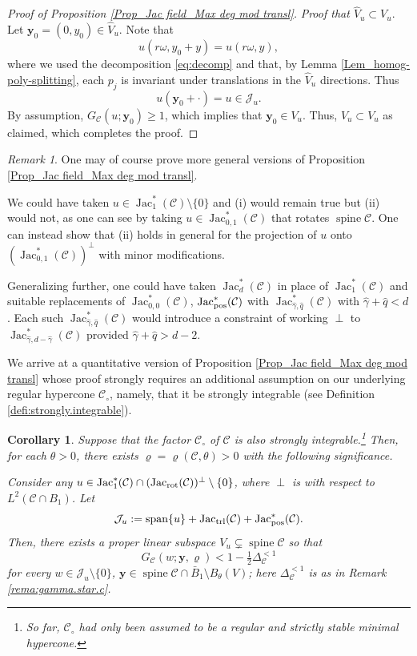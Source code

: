 \documentclass[11pt, letterpaper, reqno]{amsart}
\numberwithin{equation}{section}
\newtheorem{Cor}[Def]{Corollary}
\theoremstyle{remark}
\newtheorem{Rem}[Def]{Remark}
\newcommand{\cC}{\mathcal{C}}
\newcommand{\cJ}{\mathcal{J}}
\newcommand{\mbfy}{\mathbf{y}}
\newcommand{\Jac}{\operatorname{Jac}}
\newcommand{\spine}{\operatorname{spine}}
\begin{document}
\begin{proof}[Proof of Proposition \ref{Prop_Jac field_Max deg mod transl}]
      \textit{Proof that $\hat V_u \subset V_u$}. Let $\mbfy_0 = (0, y_0) \in \hat V_u$. Note that
      \[
      u(r \omega,y_0 + y) = u(r\omega,y),
      \]
      where we used the decomposition \eqref{eq:decomp} and that, by Lemma \ref{Lem_homog-poly-splitting}, each $p_j$ is invariant under translations in the $\hat V_u$ directions. Thus 
      $$u(\mbfy_0 + \cdot) = u \in \cJ_u. $$ 
      By assumption, $G_\cC(u; \mbfy_0) \geq 1$, which implies that $\mbfy_0 \in V_u$. Thus, $\hat V_u \subset V_u$ as claimed, which completes the proof.
      \end{proof}
      
      \begin{Rem} \label{rema:splitting-weaker}
      One may of course prove more general versions of Proposition \ref{Prop_Jac field_Max deg mod transl}. 
      
      We could have taken $u \in \Jac^*_1(\cC) \setminus \{0\}$ and (i) would remain true but (ii) would not, as one can see by taking $u \in \Jac^*_{0,1}(\cC)$ that rotates $\spine \cC$. One can instead show that (ii) holds in general for the projection of $u$ onto $(\Jac^*_{0,1}(\cC))^\perp$ with minor modifications. 
      
      Generalizing further, one could have taken $\Jac^*_d(\cC)$ in place of $\Jac^*_1(\cC)$ and suitable replacements of $\Jac^*_{0,0}(\cC)$, $\Jac^*_{\textnormal{pos}}(\cC)$ with $\Jac^*_{\hat \gamma, \hat q}(\cC)$ with $\hat \gamma + \hat q < d$. Each such $\Jac^*_{\hat \gamma, \hat q}(\cC)$ would introduce a constraint of working $\perp$ to $\Jac^*_{\hat \gamma,d-\hat \gamma}(\cC)$ provided $\hat \gamma + \hat q > d-2$.
      \end{Rem}    

    We arrive at a quantitative version of Proposition \ref{Prop_Jac field_Max deg mod transl} whose proof strongly requires an additional assumption on our underlying regular hypercone $\cC_\circ$, namely, that it be strongly integrable (see Definition \ref{defi:strongly.integrable}). 


    \begin{Cor} \label{Cor_Jac field_High degree pts concentrate}
        Suppose that the factor $\cC_\circ$ of $\cC$ is also strongly integrable.\footnote{So far, $\cC_\circ$ had only been assumed to be a regular and strictly stable minimal hypercone.} Then, for each $\theta >0$, there exists $\varrho=\varrho(\cC, \theta)>0$ with the following significance.
        
        Consider any $u\in \Jac_1^*(\cC) \cap (\Jac_\textnormal{rot}(\cC))^\perp \setminus \{0\}$, where $\perp$ is with respect to $L^2(\cC \cap B_1)$. Let
 	\[ \cJ_u := \operatorname{span} \{ u \} + \Jac_\textnormal{trl}(\cC)+\Jac_\textnormal{pos}^*(\cC). \]
	Then, there exists a proper linear subspace $V_u \subsetneq \spine \cC$ so that
        \[ G_\cC(w; \mbfy, \varrho) < 1 - \tfrac12 \Delta_\cC^{<1} \]
        for every $w \in \cJ_u \setminus \{ 0 \}$, $\mbfy\in \spine \cC \cap \bar B_1 \setminus B_\theta(V)$; here $\Delta_\cC^{<1}$ is as in Remark \ref{rema:gamma.star.c}.
    \end{Cor}
    
\end{document}
